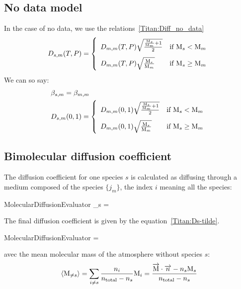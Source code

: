\subsection{No data model}

In the case of no data, we use the relations~\ref{Titan:Diff_no_data}
\begin{equation}
\renewcommand{\arraystretch}{2}
\diff_{s,m}(T,P) =
\left\{\begin{array}{l@{\quad}r}
\diff_{m,m}(T,P)\sqrt{\frac{\frac{\Mm_s}{\Mm_m} + 1}{2}} & \text{if }\Mm_s < \Mm_m    \\
\diff_{m,m}(T,P)\sqrt{\frac{\Mm_s}{\Mm_m}}               & \text{if }\Mm_s \geq \Mm_m \\
\end{array}\right.
\label{Titan:Diff_no_data}
\end{equation}
We can so say:
\begin{equation}
\begin{split}
\renewcommand{\arraystretch}{2}
&\smas{s,m} = \smas{m,m} \\ 
&\Amas{s,m} =
\left\{\begin{array}{l@{\quad}r}
\Amas{m,m}\sqrt{\frac{\frac{\Mm_s}{\Mm_m} + 1}{2}} & \text{if }\Mm_s < \Mm_m    \\
\Amas{m,m}\sqrt{\frac{\Mm_s}{\Mm_m}}                    & \text{if }\Mm_s \geq \Mm_m \\
\end{array}\right.
\end{split}
\label{Titan:Diff_no_data_to_Massman}
\end{equation}

\subsection{Bimolecular diffusion coefficient}

The diffusion coefficient for one species $s$ is calculated as diffusing through
a medium composed of the species $\{j_m\}$, the index $i$ meaning all the
species:
\begin{equationCode}{MolecularDiffusionEvaluator}
\diff_s = 
\label{Titan:Ds}
\end{equationCode}

The final diffusion coefficient is given by the equation~\ref{Titan:Ds-tilde}.
\begin{equationCode}{MolecularDiffusionEvaluator}
 = 
\label{Titan:Ds-tilde}
\end{equationCode}
avec  the mean molecular mass of the atmosphere without
species $s$:
\begin{equation}
\langle\text{M}_{\neq s}\rangle   = \sum_{i\neq s} \frac{n_i}{n_\text{total} - n_s}\text{M}_i
                      = \frac{\overrightarrow{\text{M}}\cdot\overrightarrow{n} - n_s\text{M}_s}{n_\text{total} - n_s}
\end{equation}


